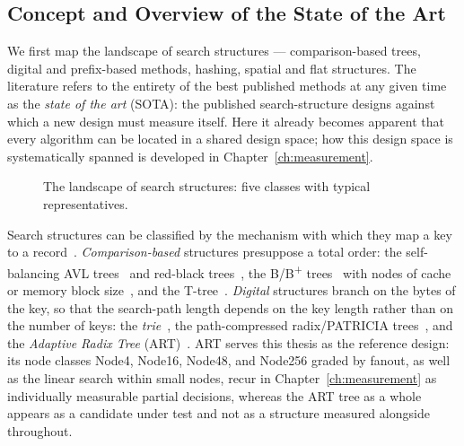 \begin{nurkurz}
\section{Concept and Overview of the State of the Art}\label{sec:overview}
We first map the landscape of search structures --- comparison-based trees, digital and prefix-based methods,
hashing, spatial and flat structures. The literature refers to the entirety of the best published methods at
any given time as the \emph{state of the art} (SOTA): the published search-structure designs against which a
new design must measure itself. Here it already becomes apparent that every algorithm can be located in a
shared design space; how this design space is systematically spanned is developed in
Chapter~\ref{ch:measurement}.
\begin{figure}[htbp]\centering
{}
\caption{The landscape of search structures: five classes with typical representatives.}\label{fig:search-map}
\end{figure}
Search structures can be classified by the mechanism with which they map a key to a
record~\cite{knuth1998taocp3}\@. \emph{Comparison-based} structures presuppose a total order: the self-balancing
AVL trees~\cite{adelsonvelsky1962avl} and red-black trees~\cite{bayer1972symmetric,guibas1978redblack}, the
B/B\textsuperscript{+} trees~\cite{bayer1972btree,comer1979btree} with nodes of cache or memory block
size~\cite{graefe2001btree,hankins2003nodesize}, and the T-tree~\cite{lehman1986ttree}\@. \emph{Digital}
structures branch on the bytes of the key, so that the search-path length depends on the key length rather
than on the number of keys: the \emph{trie}~\cite{delabriandais1959trie,fredkin1960trie}, the path-compressed
radix/PATRICIA trees~\cite{morrison1968patricia}, and the \emph{Adaptive Radix Tree} (ART)~\cite{leis2013art}.
ART serves this thesis as the reference design: its node classes Node4, Node16, Node48, and Node256 graded by
fanout, as well as the linear search within small nodes, recur in Chapter~\ref{ch:measurement} as individually
measurable partial decisions, whereas the ART tree as a whole appears as a candidate under test and not as a
structure measured alongside throughout.
\end{nurkurz}

